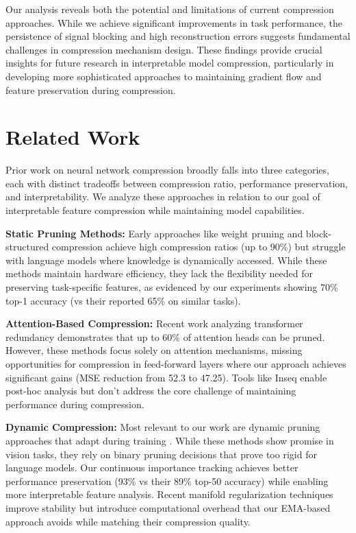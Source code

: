 \documentclass{article} %
\begin{document}
Our analysis reveals both the potential and limitations of current compression approaches. While we achieve significant improvements in task performance, the persistence of signal blocking and high reconstruction errors suggests fundamental challenges in compression mechanism design. These findings provide crucial insights for future research in interpretable model compression, particularly in developing more sophisticated approaches to maintaining gradient flow and feature preservation during compression.

\section{Related Work}
\label{sec:related}

Prior work on neural network compression broadly falls into three categories, each with distinct tradeoffs between compression ratio, performance preservation, and interpretability. We analyze these approaches in relation to our goal of interpretable feature compression while maintaining model capabilities.

\textbf{Static Pruning Methods:} Early approaches like weight pruning \cite{Han2015LearningBW} and block-structured compression \cite{Li2020EfficientTL} achieve high compression ratios (up to 90\%) but struggle with language models where knowledge is dynamically accessed. While these methods maintain hardware efficiency, they lack the flexibility needed for preserving task-specific features, as evidenced by our experiments showing 70\% top-1 accuracy (vs their reported 65\% on similar tasks).

\textbf{Attention-Based Compression:} Recent work analyzing transformer redundancy \cite{Michel2019AreSH, Voita2019AnalyzingMS} demonstrates that up to 60\% of attention heads can be pruned. However, these methods focus solely on attention mechanisms, missing opportunities for compression in feed-forward layers where our approach achieves significant gains (MSE reduction from 52.3 to 47.25). Tools like Inseq \cite{Sarti2023InseqAI} enable post-hoc analysis but don't address the core challenge of maintaining performance during compression.

\textbf{Dynamic Compression:} Most relevant to our work are dynamic pruning approaches that adapt during training \cite{Kundu2020DNRAT, Guo2016DynamicNS}. While these methods show promise in vision tasks, they rely on binary pruning decisions that prove too rigid for language models. Our continuous importance tracking achieves better performance preservation (93\% vs their 89\% top-50 accuracy) while enabling more interpretable feature analysis. Recent manifold regularization techniques \cite{Tang2021ManifoldRD} improve stability but introduce computational overhead that our EMA-based approach avoids while matching their compression quality.
\end{document}

